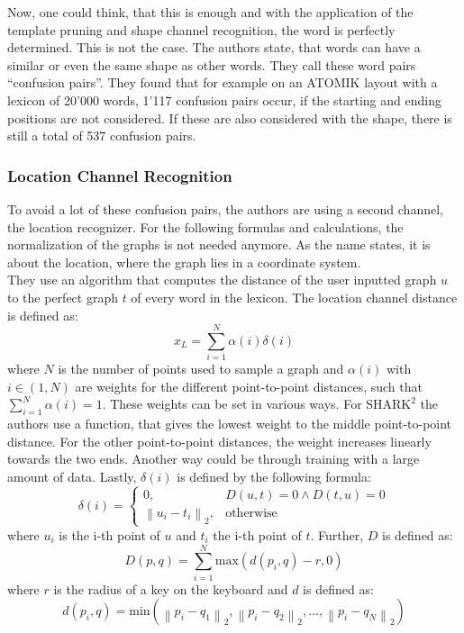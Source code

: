 Now, one could think, that this is enough and with the application of the template pruning and shape channel recognition, the word is perfectly determined. This is not the case. The authors state, that words can have a similar or even the same shape as other words. They call these word pairs ``confusion pairs''. They found that for example on an ATOMIK layout with a lexicon of 20'000 words, 1'117 confusion pairs occur, if the starting and ending positions are not considered. If these are also considered with the shape, there is still a total of 537 confusion pairs. 

\subsubsection{Location Channel Recognition}
To avoid a lot of these confusion pairs, the authors are using a second channel, the location recognizer. For the following formulas and calculations, the normalization of the graphs is not needed anymore. As the name states, it is about the location, where the graph lies in a coordinate system.\\
They use an algorithm that computes the distance of the user inputted graph $u$ to the perfect graph $t$ of every word in the lexicon. The location channel distance is defined as:
\begin{equation}
    x_L = \sum_{i = 1}^{N}\alpha(i)\delta(i)
    \label{eqn:locationformula}
\end{equation}
where $N$ is the number of points used to sample a graph and $\alpha(i)$ with $i \in (1,N)$ are weights for the different point-to-point distances, such that $\sum_{i = 1}^{N}\alpha(i) = 1$. These weights can be set in various ways. For $\text{SHARK}^2$ the authors use a function, that gives the lowest weight to the middle point-to-point distance. For the other point-to-point distances, the weight increases linearly towards the two ends. Another way could be through training with a large amount of data. Lastly, $\delta(i)$ is defined by the following formula:
\begin{equation}
    \delta(i) =
        \begin{cases}
            0, & D(u,t) = 0 \land D(t,u) = 0 \\
            \left\lVert u_i - t_i \right\rVert_2, & \text{otherwise}
        \end{cases}
\end{equation}
where $u_i$ is the i-th point of $u$ and $t_i$ the i-th point of $t$. Further, $D$ is defined as:
\begin{equation}
    D(p,q) = \sum_{i = 1}^{N}\text{max}(d(p_i,q) - r,0)
\end{equation}
where $r$ is the radius of a key on the keyboard and $d$ is defined as:
\begin{equation}
    d(p_i,q) = \text{min}(\left\lVert p_i - q_1 \right\rVert_2, \left\lVert p_i - q_2 \right\rVert_2, \dots, \left\lVert p_i - q_N\right\rVert_2)
\end{equation}


